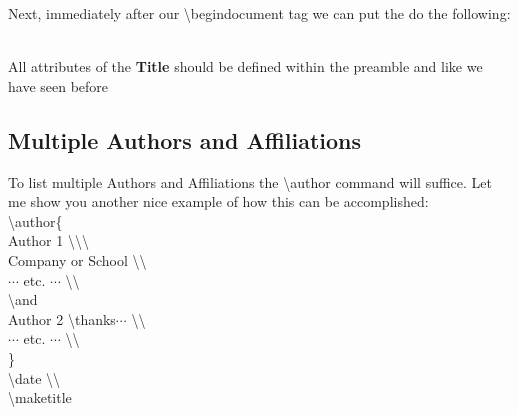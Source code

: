 Next, immediately after our \textbackslash{begin}document tag 
we can put the do the following: 

\\

All attributes of the \textbf{Title} should be defined 
within the preamble and like we have seen before 


\subsection{Multiple Authors and Affiliations}
To list multiple Authors and Affiliations the 
\textbackslash{author} command will suffice.
Let me show you another nice example of how this 
can be accomplished: \\

\textbackslash{author}\{ \\
   Author 1 \textbackslash \textbackslash \textbackslash \\
   Company or School \textbackslash \textbackslash \\
   $\cdots$ etc. $\cdots$ \textbackslash \textbackslash \\
   \textbackslash{and} \\
   Author 2 \textbackslash{thanks{$\cdots$}} \textbackslash \textbackslash \\
   $\cdots$ etc. $\cdots$ \textbackslash \textbackslash \\
   \} \\
\textbackslash{date} \textbackslash \textbackslash \\
\textbackslash{maketitle} \\



